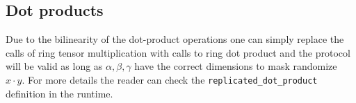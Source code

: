 \subsection{Dot products}


Due to the bilinearity of the dot-product operations
one can simply replace the calls of ring tensor multiplication with
calls to ring dot product and the protocol will be valid as long as
$\alpha, \beta, \gamma$ have the correct dimensions
to mask randomize $x \cdot y$. For more details the reader can check the
\verb|replicated_dot_product| definition in the runtime.




